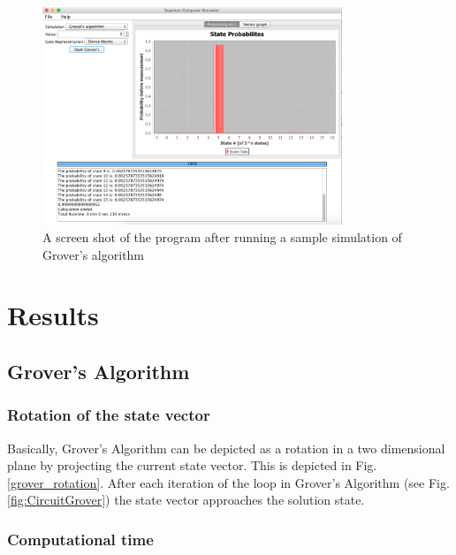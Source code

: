 \documentclass[bibliography=totocnumbered, 10pt]{article}
\theoremstyle{NoticeStyle}
\begin{document}
\begin{figure}[H]
\centering
\includegraphics[width=0.8\textwidth]{img/program_example.pdf}
\caption{A screen shot of the program after running a sample simulation of Grover's algorithm}
\end{figure}

%
\section{Results}\label{sec:Results}

\subsection{Grover's Algorithm}\label{sec:Grover}
\subsubsection{Rotation of the state vector}

Basically, Grover's Algorithm can be depicted as a rotation in a two dimensional plane by projecting the current state vector. This is depicted in Fig.\,\ref{grover_rotation}. After each iteration of the loop in Grover's Algorithm (see Fig.\,\ref{fig:CircuitGrover}) the state vector approaches the solution state.

\subsubsection{Computational time}
\end{document}
